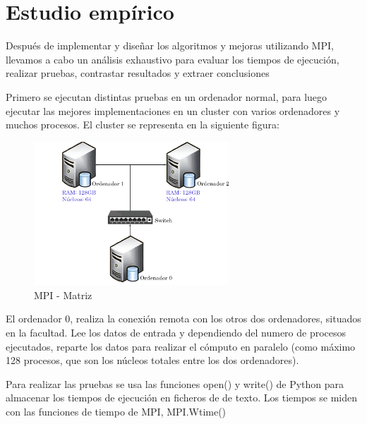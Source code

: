 


\chapter{Estudio empírico}

Después de implementar y diseñar los algoritmos y mejoras utilizando MPI, llevamos a cabo un análisis exhaustivo para evaluar los tiempos de ejecución, realizar pruebas, contrastar resultados y extraer conclusiones

Primero se ejecutan distintas pruebas en un ordenador normal, para luego ejecutar las mejores implementaciones en un cluster con varios ordenadores y muchos procesos. El cluster se representa en la siguiente figura:


\begin{figure}[!h]
	\centering
	\includegraphics[width=0.65\textwidth]{images/chapter_4/cluster}
	\caption{MPI - Matriz}
	\label{fig:cluster}
\end{figure}


\newpage

El ordenador 0, realiza la conexión remota con los otros dos ordenadores, situados en la facultad. Lee los datos de entrada y dependiendo del numero de procesos ejecutados, reparte los datos para realizar el cómputo en paralelo (como máximo 128 procesos, que son los núcleos totales entre los dos ordenadores). 

Para realizar las pruebas se usa las funciones open() y write() de Python para almacenar los tiempos de ejecución en ficheros de de texto. Los tiempos se miden con las funciones de
tiempo de MPI, MPI.Wtime()

